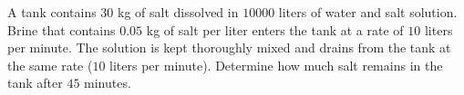 \label{problemDFQseparable-mixing-problem-1}
A tank contains $30$ kg of salt dissolved in $10000$ liters of water and salt solution. Brine that contains $0.05$ kg of salt per liter enters the tank at a rate of $10$ liters per minute. The solution is kept thoroughly mixed and drains from the tank at the same rate ($10$ liters per minute). Determine how much salt remains in the tank after $45$ minutes.

